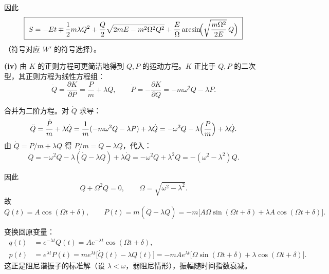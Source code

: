 \begin{question}
\begin{solution}
因此
\[
\boxed{\;
S=-Et\mp\frac12 m\lambda Q^2
+\frac{Q}{2}\sqrt{2mE-m^2\Omega^2 Q^2}
+\frac{E}{\Omega}\arcsin\!\Bigl(\sqrt{\frac{m\Omega^2}{2E}}\,Q\Bigr)
\;}
\]
（符号对应 \(W'\) 的符号选择）。

\noindent\textbf{(iv)} 由 \(K\) 的正则方程可更简洁地得到 \(Q,P\) 的运动方程。\(K\) 正比于 \(Q,P\) 的二次型，其正则方程为线性方程组：
\[
\dot Q=\frac{\partial K}{\partial P}=\frac{P}{m}+\lambda Q,\qquad
\dot P=-\frac{\partial K}{\partial Q}=-m\omega^2 Q-\lambda P .
\]

合并为二阶方程。对 \(\dot Q\) 求导：
\[
\ddot Q=\frac{\dot P}{m}+\lambda\dot Q
=\frac{1}{m}(-m\omega^2 Q-\lambda P)+\lambda\dot Q
=-\omega^2 Q-\lambda\Bigl(\frac{P}{m}\Bigr)+\lambda\dot Q .
\]
由 \(\dot Q=P/m+\lambda Q\) 得 \(P/m=\dot Q-\lambda Q\)，代入：
\[
\ddot Q=-\omega^2 Q-\lambda(\dot Q-\lambda Q)+\lambda\dot Q
=-\omega^2 Q+\lambda^2 Q = -(\omega^2-\lambda^2)Q .
\]

因此
\[
\ddot Q+\Omega^2 Q=0,\qquad\Omega=\sqrt{\omega^2-\lambda^2}.
\]
故
\[
Q(t)=A\cos(\Omega t+\delta),\qquad
P(t)=m(\dot Q-\lambda Q)=-m\bigl[A\Omega\sin(\Omega t+\delta)+\lambda A\cos(\Omega t+\delta)\bigr].
\]

变换回原变量：
\[
\boxed{\;
\begin{aligned}
q(t)&=e^{-\lambda t}Q(t)=A e^{-\lambda t}\cos(\Omega t+\delta),\\[4pt]
p(t)&=e^{\lambda t}P(t)=m e^{\lambda t}\bigl[\dot Q(t)-\lambda Q(t)\bigr]
=-m A e^{\lambda t}\bigl[\Omega\sin(\Omega t+\delta)+\lambda\cos(\Omega t+\delta)\bigr].
\end{aligned}
\;}
\]
这正是阻尼谐振子的标准解（设 \(\lambda<\omega\)，弱阻尼情形），振幅随时间指数衰减。
\end{solution}
\end{question}

